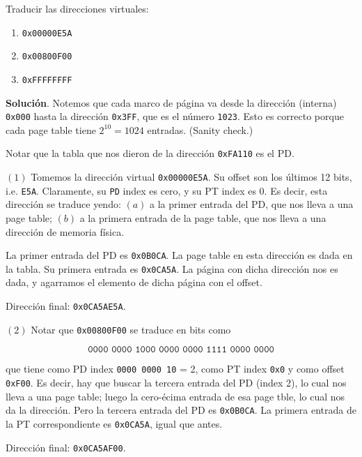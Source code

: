 \documentclass[12pt]{article}
\theoremstyle{definition}
\begin{document}
\begin{shaded}
    Traducir las direcciones virtuales:

    \begin{enumerate}
        \item \texttt{0x00000E5A}
        \item \texttt{0x00800F00}
        \item \texttt{0xFFFFFFFF}
    \end{enumerate}
\end{shaded}

\textbf{Solución}. Notemos que cada marco de página va desde la dirección
(interna) \texttt{0x000} hasta la dirección \texttt{0x3FF}, que es el número
\texttt{1023}. Esto es correcto porque cada page table tiene $2^{10} = 1024$
entradas. (Sanity check.)

Notar que la tabla que nos dieron de la dirección \texttt{0xFA110} es el PD.

$(1)$ Tomemos la dirección virtual \texttt{0x00000E5A}. Su offset son los
últimos 12 bits, i.e. \texttt{E5A}. Claramente, su \texttt{PD} index es cero, y
su PT index es 0. Es decir, esta dirección se traduce yendo: $(a)$ a la primer
entrada del PD, que nos lleva a una page table; $(b)$ a la primera entrada de la
page table, que nos lleva a una dirección de memoria física.

La primer entrada del PD es \texttt{0x0B0CA}. La page table en esta dirección es
dada en la tabla. Su primera entrada es \texttt{0x0CA5A}. La página con dicha
dirección nos es dada, y agarramos el elemento de dicha página con el offset.

Dirección final: \texttt{0x0CA5AE5A}.

$(2)$ Notar que \texttt{0x00800F00} se traduce en bits como 



\begin{equation*}
 \texttt{0000 0000 1000 0000 0000 1111 0000 0000}   
\end{equation*}

que tiene como PD index \texttt{0000 0000 10} = 2, como PT index \texttt{0x0} y
como offset \texttt{0xF00}. Es decir, hay que buscar la tercera entrada del PD
(index 2), lo cual nos lleva a una page table; luego la cero-écima entrada de
esa page  tble, lo cual nos da la dirección. Pero la tercera entrada del PD es
\texttt{0x0B0CA}. La primera entrada de la PT correspondiente es
\texttt{0x0CA5A}, igual que antes. 

Dirección final: \texttt{0x0CA5AF00}.
\end{document}
